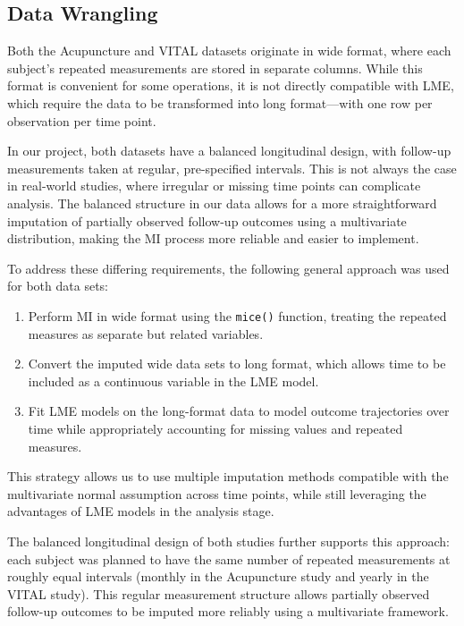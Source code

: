 \documentclass{article}
\providecommand{\tightlist}{%
  \setlength{\itemsep}{0pt}\setlength{\parskip}{0pt}}
\begin{document}
\subsection{Data Wrangling}\label{data-wrangling}

Both the Acupuncture and VITAL datasets originate in wide format, where
each subject's repeated measurements are stored in separate columns.
While this format is convenient for some operations, it is not directly
compatible with LME, which require the data to be transformed into long
format---with one row per observation per time point.

In our project, both datasets have a balanced longitudinal design, with
follow-up measurements taken at regular, pre-specified intervals. This
is not always the case in real-world studies, where irregular or missing
time points can complicate analysis. The balanced structure in our data
allows for a more straightforward imputation of partially observed
follow-up outcomes using a multivariate distribution, making the MI
process more reliable and easier to implement.

To address these differing requirements, the following general approach
was used for both data sets:

\begin{enumerate}
\def\labelenumi{\arabic{enumi}.}
\tightlist
\item
  Perform MI in wide format using the \texttt{mice()} function, treating
  the repeated measures as separate but related variables.
\item
  Convert the imputed wide data sets to long format, which allows time
  to be included as a continuous variable in the LME model.
\item
  Fit LME models on the long-format data to model outcome trajectories
  over time while appropriately accounting for missing values and
  repeated measures.
\end{enumerate}

This strategy allows us to use multiple imputation methods compatible
with the multivariate normal assumption across time points, while still
leveraging the advantages of LME models in the analysis stage.

The balanced longitudinal design of both studies further supports this
approach: each subject was planned to have the same number of repeated
measurements at roughly equal intervals (monthly in the Acupuncture
study and yearly in the VITAL study). This regular measurement structure
allows partially observed follow-up outcomes to be imputed more reliably
using a multivariate framework.
\end{document}
